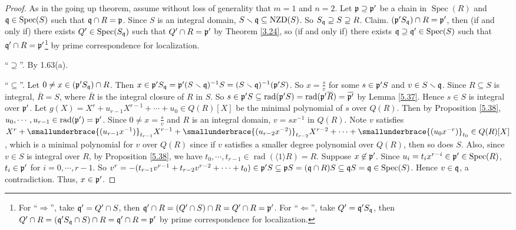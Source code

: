 \begin{proof}
    As in the going up theorem, assume without loss of generality that $m = 1$ and $n = 2$. Let $\mathfrak{p} \supseteq \mathfrak{p}'$ be a chain in $\operatorname{Spec}(R)$ and $\mathfrak{q} \in \operatorname{Spec}(S)$ such that $\mathfrak{q} \cap R = \mathfrak{p}$. Since $S$ is an integral domain, $S \smallsetminus \mathfrak{q} \subseteq \operatorname{NZD}(S)$. So $S_{\mathfrak{q}} \supseteq S \supseteq R$. Claim. $(\mathfrak{p}'S_{\mathfrak{q}}) \cap R = \mathfrak{p}'$, then (if and only if) there exists $Q' \in \operatorname{Spec}(S_{\mathfrak{q}})$ such that $Q' \cap R = \mathfrak{p}'$ by Theorem \ref{3.24}, so (if and only if) there exists $\mathfrak{q} \supseteq \mathfrak{q}' \in \operatorname{Spec}(S)$ such that $\mathfrak{q}' \cap R = \mathfrak{p}'$\footnote[2]{For ``$\Rightarrow$'', take $\mathfrak{q}' = Q' \cap S$, then $\mathfrak{q}' \cap R = (Q' \cap S) \cap R = Q' \cap R = \mathfrak{p}'$. For ``$\Leftarrow$'', take $Q' = \mathfrak{q}' S_{\mathfrak{q}}$, then $Q' \cap R = (\mathfrak{q}'S_{\mathfrak{q}} \cap S) \cap R = \mathfrak{q}' \cap R = \mathfrak{p}'$ by prime correspondence for localization.} by prime correspondence for localization. \par
    ``$\supseteq$''. By 1.63(a). \par
    ``$\subseteq$''. Let $0 \neq x \in (\mathfrak{p}'S_{\mathfrak{q}}) \cap R$. Then $x \in \mathfrak{p}'S_{\mathfrak{q}} = \mathfrak{p}' (S \smallsetminus \mathfrak{q})^{-1}S = (S \smallsetminus \mathfrak{q})^{-1} (\mathfrak{p}'S)$. So $x = \frac{s}{v}$ for some $s \in \mathfrak{p}'S$ and $v \in S \smallsetminus \mathfrak{q}$. Since $R \subseteq S$ is integral, $\overbar{R} = S$, where $\overbar{R}$ is the integral closure of $R$ in $S$. So $s \in \ffp'S \subseteq \operatorname{rad}(\ffp'S) = \operatorname{rad}(\ffp'\overbar{R}) = \overbar{\ffp'}$ by Lemma \ref{5.37}. Hence $s \in S$ is integral over $\mathfrak{p}'$. Let $g(X) = X^{r} + u_{r-1}X^{r-1} + \cdots + u_0 \in Q(R)[X]$ be the minimal polynomial of $s$ over $Q(R)$. Then by Proposition \ref{5.38}, $u_0,\cdots,u_{r-1} \in \operatorname{rad}(\mathfrak{p}') = \mathfrak{p}'$. Since $0 \neq x = \frac{s}{v}$ and $R$ is an integral domain, $v = sx^{-1}$ in $Q(R)$. Note $v$ satisfies $X^{r} + \smallunderbrace{(u_{r-1}x^{-1})}_{t_{r-1}} X^{r-1} + \smallunderbrace{(u_{r-2}x^{-2})}_{t_{r-2}}X^{r-2} + \cdots + \smallunderbrace{(u_0x^{-r})}_{t_0} \in Q(R)[X]$, which is a minimal polynomial for $v$ over $Q(R)$ since if $v$ satisfies a smaller degree polynomial over $Q(R)$, then so does $S$. Also, since $v \in S$ is integral over $R$, by Proposition \ref{5.38}, we have $t_0,\cdots,t_{r-1} \in \operatorname{rad}(\langle 1 \rangle R) = R$. Suppose $x \not\in \mathfrak{p}'$. Since $u_i = t_{i}x^{r-i} \in \mathfrak{p}' \in \operatorname{Spec}(R)$, $t_i \in \mathfrak{p}'$ for $i = 0,\cdots,r-1$. So $v^{r} = -(t_{r-1}v^{r-1} + t_{r-2}v^{r-2} + \cdots + t_0) \in \mathfrak{p}'S \subseteq \mathfrak{p} S = (\mathfrak{q} \cap R)S \subseteq \mathfrak{q} S = \mathfrak{q} \in \operatorname{Spec}(S)$. Hence $v \in \mathfrak{q}$, a contradiction. Thus, $x \in \mathfrak{p}'$.
\end{proof}

